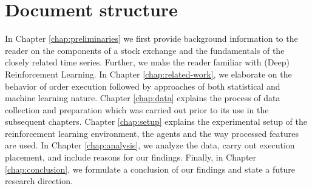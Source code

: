 \section{Document structure}

In Chapter \ref{chap:preliminaries} we first provide background information to the reader on the components of a stock exchange and the fundamentals of the closely related time series.
Further, we make the reader familiar with (Deep) Reinforcement Learning.
In Chapter \ref{chap:related-work}, we elaborate on the behavior of order execution followed by approaches of both statistical and machine learning nature.
Chapter \ref{chap:data} explains the process of data collection and preparation which was carried out prior to its use in the subsequent chapters.
Chapter \ref{chap:setup} explains the experimental setup of the reinforcement learning environment, the agents and the way processed features are used.
In Chapter \ref{chap:analysis}, we analyze the data, carry out execution placement, and include reasons for our findings.
Finally, in Chapter \ref{chap:conclusion}, we formulate a conclusion of our findings and state a future research direction.

